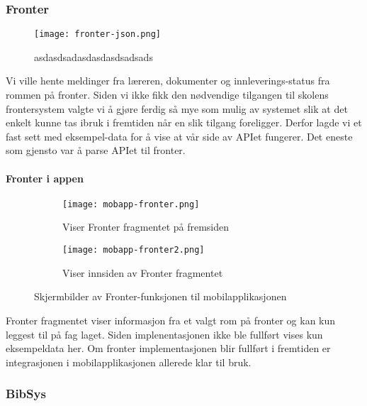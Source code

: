 \documentclass[../main.tex]{subfiles}
\begin{document}
\subsubsection{Fronter}

\begin{figure}[H]
  \centering
  \texttt{[image: fronter-json.png]}
  \caption{asdasdsadasdasdasdsadsads}
\end{figure}

Vi ville hente meldinger fra læreren, dokumenter og innleverings-status fra rommen på fronter.\newline
\newline
Siden vi ikke fikk den nødvendige tilgangen til skolens frontersystem valgte vi å gjøre ferdig så mye som mulig av systemet slik at det enkelt kunne tas ibruk i fremtiden når en slik tilgang foreligger. Derfor lagde vi et fast sett med eksempel-data for å vise at vår side av APIet fungerer. Det eneste som gjensto var å parse APIet til fronter.

\paragraph{Fronter i appen}

\begin{figure}[H]
        \centering
        \begin{subfigure}[b]{0.3\textwidth}
                \centering
                \texttt{[image: mobapp-fronter.png]}
                \caption{Viser Fronter fragmentet på fremsiden}
        \end{subfigure}
        \quad
        \begin{subfigure}[b]{0.3\textwidth}
                \centering
                \texttt{[image: mobapp-fronter2.png]}
                \caption{Viser innsiden av Fronter fragmentet}
        \end{subfigure}
        \caption{Skjermbilder av Fronter-funksjonen til mobilapplikasjonen}
\end{figure}

Fronter fragmentet viser informasjon fra et valgt rom på fronter og kan kun leggest til på fag laget. Siden implenentasjonen ikke ble fullført vises kun eksempeldata her. Om fronter implementasjonen blir fullført i fremtiden er integrasjonen i mobilapplikasjonen allerede klar til bruk. 

\subsubsection{BibSys}
\end{document}
